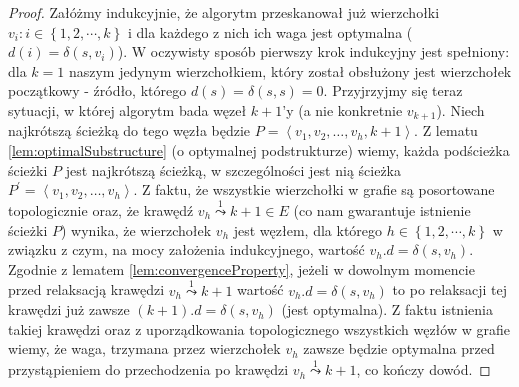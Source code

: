 \begin{proof}
Załóżmy indukcyjnie, że algorytm przeskanował już wierzchołki $v_{i} : i \in \left\{ 1, 2, \cdots, k \right\}$ i dla każdego z nich ich waga jest optymalna ($d \left( i \right) = \delta \left( s, v_{i} \right)$). W oczywisty sposób pierwszy krok indukcyjny jest spełniony: dla $k = 1$ naszym jedynym wierzchołkiem, który został obsłużony jest wierzchołek początkowy - źródło, którego $d \left( s \right) = \delta \left( s, s \right) = 0$. Przyjrzyjmy się teraz sytuacji, w której algorytm bada węzeł $k+1$'y (a nie konkretnie $v_{k+1}$). Niech najkrótszą ścieżką do tego węzła będzie $P = \left \langle v_{1}, v_{2}, \ldots, v_{h}, k+1 \right \rangle $. Z lematu \ref{lem:optimalSubstructure} (o optymalnej podstrukturze) wiemy, każda podścieżka ścieżki $P$ jest najkrótszą ścieżką, w szczególności jest nią ścieżka $P^{'} = \left \langle v_{1}, v_{2}, \ldots, v_{h} \right \rangle $. Z faktu, że wszystkie wierzchołki w grafie są posortowane topologicznie oraz, że krawędź $v_{h} \overset{1}\leadsto k+1 \in E$ (co nam gwarantuje istnienie ścieżki $P$) wynika, że wierzchołek $v_{h}$ jest węzłem, dla którego $h \in \left\{ 1, 2, \cdots, k \right\}$ w związku z czym, na mocy założenia indukcyjnego, wartość $v_{h}.d = \delta \left( s, v_{h} \right)$. Zgodnie z lematem \ref{lem:convergenceProperty}, jeżeli w dowolnym momencie przed relaksacją krawędzi $v_{h} \overset{1}\leadsto k+1$ wartość $v_{h}.d = \delta \left( s, v_{h} \right)$ to po relaksacji tej krawędzi już zawsze $ \left( k+1 \right).d = \delta \left( s, v_{h} \right) $ (jest optymalna). Z faktu istnienia takiej krawędzi oraz z uporządkowania topologicznego wszystkich węzłów w grafie wiemy, że waga, trzymana przez wierzchołek $v_{h}$ zawsze będzie optymalna przed przystąpieniem do przechodzenia po krawędzi $v_{h} \overset{1}\leadsto k+1$, co kończy dowód.
\end{proof}


